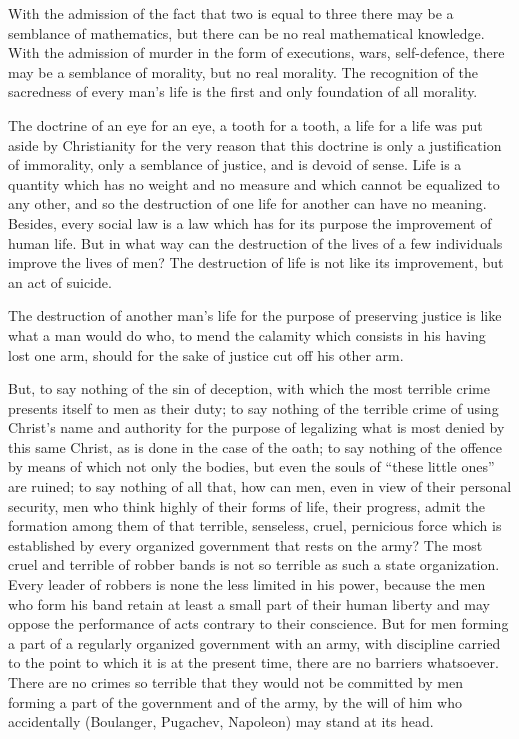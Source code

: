 \documentclass{book}
\begin{document}
With the admission of the fact that two is equal to three there may be a semblance of mathematics, but there can be no real mathematical knowledge. With the admission of murder in the form of executions, wars, self-defence, there may be a semblance of morality, but no real morality. The recognition of the sacredness of every man’s life is the first and only foundation of all morality.

The doctrine of an eye for an eye, a tooth for a tooth, a life for a life was put aside by Christianity for the very reason that this doctrine is only a justification of immorality, only a semblance of justice, and is devoid of sense. Life is a quantity which has no weight and no measure and which cannot be equalized to any other, and so the destruction of one life for another can have no meaning. Besides, every social law is a law which has for its purpose the improvement of human life. But in what way can the destruction of the lives of a few individuals improve the lives of men? The destruction of life is not like its improvement, but an act of suicide.

The destruction of another man’s life for the purpose of preserving justice is like what a man would do who, to mend the calamity which consists in his having lost one arm, should for the sake of justice cut off his other arm.

But, to say nothing of the sin of deception, with which the most terrible crime presents itself to men as their duty; to say nothing of the terrible crime of using Christ’s name and authority for the purpose of legalizing what is most denied by this same Christ, as is done in the case of the oath; to say nothing of the offence by means of which not only the bodies, but even the souls of “these little ones” are ruined; to say nothing of all that, how can men, even in view of their personal security, men who think highly of their forms of life, their progress, admit the formation among them of that terrible, senseless, cruel, pernicious force which is established by every organized government that rests on the army? The most cruel and terrible of robber bands is not so terrible as such a state organization. Every leader of robbers is none the less limited in his power, because the men who form his band retain at least a small part of their human liberty and may oppose the performance of acts contrary to their conscience. But for men forming a part of a regularly organized government with an army, with discipline carried to the point to which it is at the present time, there are no barriers whatsoever. There are no crimes so terrible that they would not be committed by men forming a part of the government and of the army, by the will of him who accidentally (Boulanger, Pugachev, Napoleon) may stand at its head.
\end{document}

